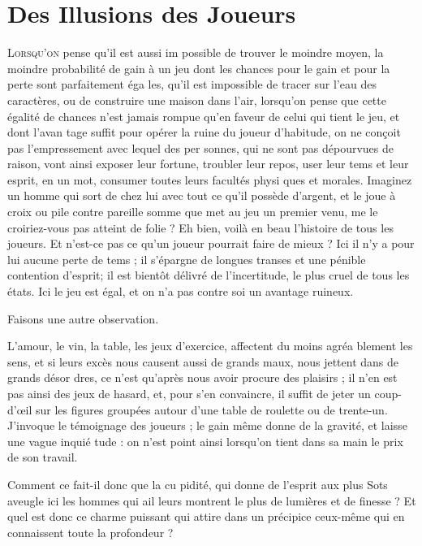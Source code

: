 \chapter{Des Illusions des Joueurs}

\lettrine{L}{orsqu'on} pense qu'il est aussi im%
possible de trouver le moindre moyen,
la moindre probabilité de gain à un
jeu dont les chances pour le gain et
pour la perte sont parfaitement éga%
les, qu'il est impossible de tracer sur
l'eau des caractères, ou de construire
une maison dans l'air, lorsqu'on
pense que cette égalité de chances
n'est jamais rompue qu'en faveur de
celui qui tient le jeu, et dont l'avan%
tage suffit pour opérer la ruine du
joueur d'habitude, on ne conçoit pas
l'empressement avec lequel des per%
sonnes, qui ne sont pas dépourvues
de raison, vont ainsi exposer leur
fortune, troubler leur repos, user
leur tems et leur esprit, en un mot,
consumer toutes leurs facultés physi%
ques et morales. Imaginez un homme
qui sort de chez lui avec tout ce qu'il
possède d'argent, et le joue à croix
ou pile contre pareille somme que
met au jeu un premier venu, me le
croiriez-vous pas atteint de folie ? Eh
bien, voilà en beau l'histoire de tous
les joueurs. Et n'est-ce pas ce qu'un
joueur pourrait faire de mieux ? Ici il
n'y a pour lui aucune perte de tems ;
il s'épargne de longues transes et
une pénible contention d'esprit; il
est bientôt délivré de l'incertitude, le
plus cruel de tous les états. Ici le jeu
est égal, et on n'a pas contre soi un
avantage ruineux.

Faisons une autre observation.

L'amour, le vin, la table, les jeux
d'exercice, affectent du moins agréa%
blement les sens, et si leurs excès
nous causent aussi de grands maux,
nous jettent dans de grands désor%
dres, ce n'est qu'après nous avoir
procure des plaisirs ; il n'en est pas
ainsi des jeux de hasard, et, pour
s'en convaincre, il suffit de jeter un
coup-d'œil sur les figures groupées
autour d'une table de roulette ou de
trente-un. J'invoque le témoignage
des joueurs ; le gain même donne de
la gravité, et laisse une vague inquié%
tude : on n'est point ainsi lorsqu'on
tient dans sa main le prix de son
travail.

Comment ce fait-il donc que la cu%
pidité, qui donne de l'esprit aux plus
Sots aveugle ici les hommes qui ail%
leurs montrent le plus de lumières et
de finesse ? Et quel est donc ce charme
puissant qui attire dans un précipice
ceux-même qui en connaissent toute
la profondeur ?

